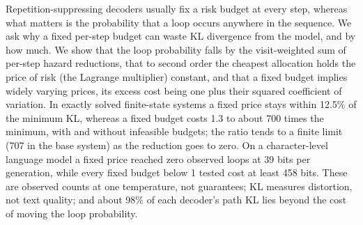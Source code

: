 Repetition-suppressing decoders usually fix a risk budget at every step, whereas what matters is the probability that a loop occurs anywhere in the sequence. We ask why a fixed per-step budget can waste KL divergence from the model, and by how much. We show that the loop probability falls by the visit-weighted sum of per-step hazard reductions, that to second order the cheapest allocation holds the price of risk (the Lagrange multiplier) constant, and that a fixed budget implies widely varying prices, its excess cost being one plus their squared coefficient of variation. In exactly solved finite-state systems a fixed price stays within 12.5\% of the minimum KL, whereas a fixed budget costs 1.3 to about 700 times the minimum, with and without infeasible budgets; the ratio tends to a finite limit (707 in the base system) as the reduction goes to zero. On a character-level language model a fixed price reached zero observed loops at 39 bits per generation, while every fixed budget below 1 tested cost at least 458 bits. These are observed counts at one temperature, not guarantees; KL measures distortion, not text quality; and about 98\% of each decoder's path KL lies beyond the cost of moving the loop probability.
